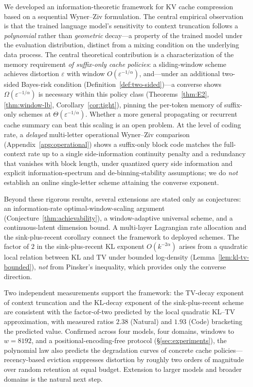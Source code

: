 \documentclass[11pt]{article}
\newcommand{\KLs}{\mathrm{KL}}
\newcommand{\TV}{\mathrm{TV}}
\theoremstyle{plain}
\theoremstyle{definition}
\theoremstyle{remark}
\begin{document}
We developed an information-theoretic framework for KV cache
compression based on a sequential Wyner--Ziv formulation. The
central empirical observation is that the trained language model's
sensitivity to context truncation follows a \emph{polynomial}
rather than \emph{geometric} decay---a property of the trained
model under the evaluation distribution, distinct from a mixing
condition on the underlying data process. The central theoretical
contribution is a characterization of the memory requirement
\emph{of suffix-only cache policies}: a sliding-window scheme
achieves distortion $\varepsilon$ with window
$O(\varepsilon^{-1/\alpha})$, and---under an additional two-sided
Bayes-risk condition (Definition~\ref{def:two-sided})---a converse
shows $\Omega(\varepsilon^{-1/\alpha})$ is necessary within this
policy class (Theorems~\ref{thm:E2}, \ref{thm:window-lb},
Corollary~\ref{cor:tight}), pinning the per-token memory of
suffix-only schemes at $\Theta(\varepsilon^{-1/\alpha})$. Whether a
more general propagating or recurrent cache summary can beat this
scaling is an open problem. At the level of coding rate, a \emph{delayed} multi-letter
operational Wyner--Ziv comparison (Appendix~\ref{app:operational})
shows a suffix-only block code matches the full-context rate up to a
single side-information continuity penalty and a redundancy that
vanishes with block length, under quantized query side information and
explicit information-spectrum and de-binning-stability assumptions; we do \emph{not}
establish an online single-letter scheme attaining the converse
exponent.

Beyond these rigorous results, several extensions are stated only as
conjectures: an information-rate optimal-window-scaling argument
(Conjecture~\ref{thm:achievability}), a window-adaptive universal
scheme, and a continuous-latent dimension bound. A multi-layer
Lagrangian rate allocation and the sink-plus-recent corollary connect
the framework to deployed schemes. The factor of $2$ in the
sink-plus-recent KL exponent $O(k^{-2\alpha})$ arises from a
quadratic local relation between $\KLs$ and $\TV$ under bounded
log-density (Lemma~\ref{lem:kl-tv-bounded}), \emph{not} from
Pinsker's inequality, which provides only the converse direction.

Two independent measurements support the framework: the TV-decay
exponent of context truncation and the KL-decay exponent of the
sink-plus-recent scheme are consistent with the factor-of-two
predicted by the local quadratic KL--TV approximation, with
measured ratios $2.38$ (Natural) and $1.93$ (Code) bracketing the
predicted value. Confirmed across four models, four domains, windows
to $w = 8192$, and a positional-encoding-free protocol
(\S\ref{sec:experiments}), the polynomial law also predicts the
degradation curves of concrete cache policies---recency-based
eviction suppresses distortion by roughly two orders of magnitude
over random retention at equal budget. Extension to larger models
and broader domains is the natural next step.
\end{document}
